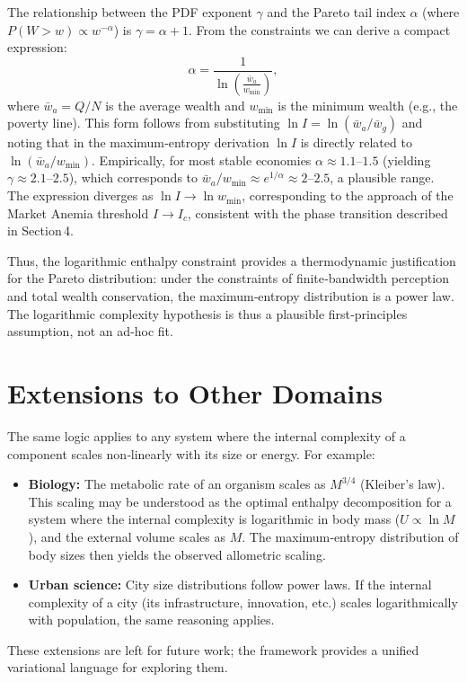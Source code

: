 \documentclass{article}
\begin{document}
The relationship between the PDF exponent $\gamma$ and the Pareto tail index $\alpha$ (where $P(W>w) \propto w^{-\alpha}$) is $\gamma = \alpha + 1$. From the constraints we can derive a compact expression:
\[
\alpha = \frac{1}{\ln\left( \frac{\bar{w}_a}{w_{\min}} \right)},
\]
where $\bar{w}_a = Q/N$ is the average wealth and $w_{\min}$ is the minimum wealth (e.g., the poverty line). This form follows from substituting $\ln I = \ln(\bar{w}_a / \bar{w}_g)$ and noting that in the maximum‑entropy derivation $\ln I$ is directly related to $\ln(\bar{w}_a / w_{\min})$. Empirically, for most stable economies $\alpha \approx 1.1$–$1.5$ (yielding $\gamma \approx 2.1$–$2.5$), which corresponds to $\bar{w}_a / w_{\min} \approx e^{1/\alpha} \approx 2$–$2.5$, a plausible range. The expression diverges as $\ln I \to \ln w_{\min}$, corresponding to the approach of the Market Anemia threshold $I \to I_c$, consistent with the phase transition described in Section 4.

Thus, the logarithmic enthalpy constraint provides a thermodynamic justification for the Pareto distribution: under the constraints of finite‑bandwidth perception and total wealth conservation, the maximum‑entropy distribution is a power law. The logarithmic complexity hypothesis is thus a plausible first‑principles assumption, not an ad‑hoc fit.

\section{Extensions to Other Domains}
The same logic applies to any system where the internal complexity of a component scales non‑linearly with its size or energy. For example:
\begin{itemize}
    \item \textbf{Biology:} The metabolic rate of an organism scales as $M^{3/4}$ (Kleiber’s law). This scaling may be understood as the optimal enthalpy decomposition for a system where the internal complexity is logarithmic in body mass ($U \propto \ln M$), and the external volume scales as $M$. The maximum‑entropy distribution of body sizes then yields the observed allometric scaling.
    \item \textbf{Urban science:} City size distributions follow power laws. If the internal complexity of a city (its infrastructure, innovation, etc.) scales logarithmically with population, the same reasoning applies.
\end{itemize}
These extensions are left for future work; the framework provides a unified variational language for exploring them.
\end{document}
